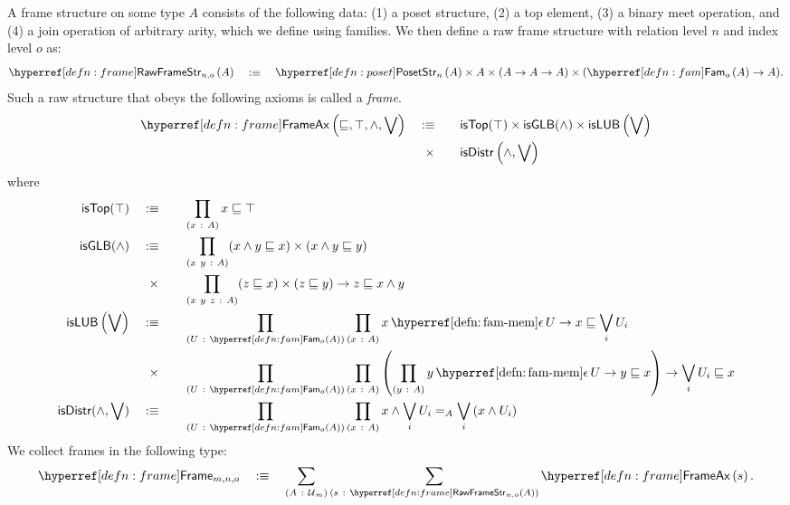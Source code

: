 \begin{defn}[Frame]\label{defn:frame}
  A frame structure on some type $A$ consists of the following data: (1) a poset
  structure, (2) a top element, (3) a binary meet operation, and (4) a join operation of
  arbitrary arity, which we define using families. We then define a raw frame structure
  with relation level $n$ and index level $o$ as:
  \begin{equation*}
    \rawframestr{n}{o}{A} \quad\is\quad \posetstr{n}{A} \times A \times (A \rightarrow A \rightarrow A) \times (\sub{o}{A} \rightarrow A).
  \end{equation*}
  Such a raw structure that obeys the following axioms is called a \emph{frame}.
  \begin{alignat*}{2}
    \frameax{\sqsubseteq, \top, \wedge, \bigvee} \quad&\is\quad             &&\mathsf{isTop}(\top) \times
                                              \mathsf{isGLB}(\wedge) \times
                                              \mathsf{isLUB}\left( \bigvee \right)\\
                          &\hspace{0.55em}\times &&\mathsf{isDistr}\left( \wedge, \bigvee \right)
  \end{alignat*}
  where
  \begin{alignat*}{2}
    \mathsf{isTop}(\top) \quad&\is\quad &&\pity{x}{A}{x \sqsubseteq \top}\\
    \mathsf{isGLB}(\wedge) \quad&\is\quad &&\pity{x~y}{A}{(x \wedge y \sqsubseteq x) \times (x \wedge y \sqsubseteq y)}\\
                       &\hspace{0.55em}\times &&\pity{x~y~z}{A}{(z \sqsubseteq x) \times (z \sqsubseteq y) \rightarrow z \sqsubseteq x \wedge y}\\
    \mathsf{isLUB}\left(\bigvee\right) \quad&\is\quad
         &&\pity{U}{\sub{o}{A}}{\pity{x}{A}{\memfam{x}{U} \rightarrow x \sqsubseteq \bigvee_i U_i}}\\
         &\hspace{0.55em}\times &&\pity{U}{\sub{o}{A}}{\pity{x}{A}{
        \left( \pity{y}{A}{\memfam{y}{U} \rightarrow y \sqsubseteq x}\right) \rightarrow \bigvee_i U_i \sqsubseteq x }}\\
    \mathsf{isDistr}(\wedge, \bigvee) \quad&\is\quad
      &&\pity{U}{\sub{o}{A}}{\pity{x}{A}{
          x \wedge \bigvee_i U_i} =_A \bigvee_i \left( x \wedge U_i \right)
      }
  \end{alignat*}
  We collect frames in the following type:
  \begin{equation*}
    \framety{m}{n}{o} \quad\is\quad
      \sigmaty{A}{\univ{}_m}{
        \sigmaty{s}{\rawframestr{n}{o}{A}}{\frameax{s}}
      }.
  \end{equation*}
\end{defn}

